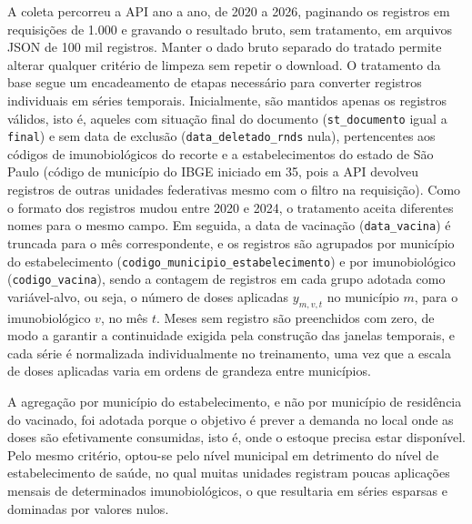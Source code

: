 \documentclass[
    12pt,
    openright,
    oneside,
    a4paper,
    english,
    brazil
]{abntex2}
\begin{document}
A coleta percorreu a API ano a ano, de 2020 a 2026, paginando os registros em requisições de 1.000 e gravando o resultado bruto, sem tratamento, em arquivos JSON de 100 mil registros. Manter o dado bruto separado do tratado permite alterar qualquer critério de limpeza sem repetir o download. O tratamento da base segue um encadeamento de etapas necessário para converter registros individuais em séries temporais. Inicialmente, são mantidos apenas os registros válidos, isto é, aqueles com situação final do documento (\texttt{st\_documento} igual a \texttt{final}) e sem data de exclusão (\texttt{data\_deletado\_rnds} nula), pertencentes aos códigos de imunobiológicos do recorte e a estabelecimentos do estado de São Paulo (código de município do IBGE iniciado em 35, pois a API devolveu registros de outras unidades federativas mesmo com o filtro na requisição). Como o formato dos registros mudou entre 2020 e 2024, o tratamento aceita diferentes nomes para o mesmo campo. Em seguida, a data de vacinação (\texttt{data\_vacina}) é truncada para o mês correspondente, e os registros são agrupados por município do estabelecimento (\texttt{codigo\_municipio\_estabelecimento}) e por imunobiológico (\texttt{codigo\_vacina}), sendo a contagem de registros em cada grupo adotada como variável-alvo, ou seja, o número de doses aplicadas $y_{m,v,t}$ no município $m$, para o imunobiológico $v$, no mês $t$. Meses sem registro são preenchidos com zero, de modo a garantir a continuidade exigida pela construção das janelas temporais, e cada série é normalizada individualmente no treinamento, uma vez que a escala de doses aplicadas varia em ordens de grandeza entre municípios.

A agregação por município do estabelecimento, e não por município de residência do vacinado, foi adotada porque o objetivo é prever a demanda no local onde as doses são efetivamente consumidas, isto é, onde o estoque precisa estar disponível. Pelo mesmo critério, optou-se pelo nível municipal em detrimento do nível de estabelecimento de saúde, no qual muitas unidades registram poucas aplicações mensais de determinados imunobiológicos, o que resultaria em séries esparsas e dominadas por valores nulos.
\end{document}
